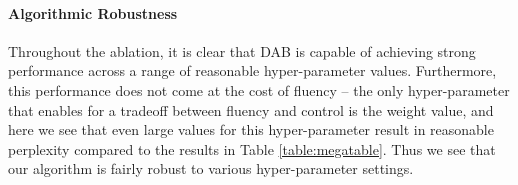 \paragraph{Algorithmic Robustness} Throughout the ablation, it is clear that DAB is capable of achieving strong performance across a range of reasonable hyper-parameter values.
Furthermore, this performance does not come at the cost of fluency -- the only hyper-parameter that enables for a tradeoff between fluency and control is the weight value, and here we see that even large values for this hyper-parameter result in reasonable perplexity compared to the results in Table \ref{table:megatable}. 
Thus we see that our algorithm is fairly robust to various hyper-parameter settings. 
 
